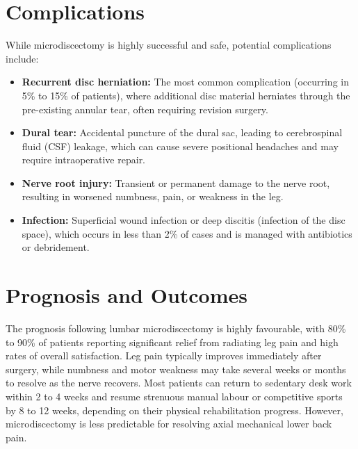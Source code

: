 \section*{Complications}
While microdiscectomy is highly successful and safe, potential complications include:
\begin{itemize}
    \item \textbf{Recurrent disc herniation:} The most common complication (occurring in 5\% to 15\% of patients), where additional disc material herniates through the pre-existing annular tear, often requiring revision surgery.
    \item \textbf{Dural tear:} Accidental puncture of the dural sac, leading to cerebrospinal fluid (CSF) leakage, which can cause severe positional headaches and may require intraoperative repair.
    \item \textbf{Nerve root injury:} Transient or permanent damage to the nerve root, resulting in worsened numbness, pain, or weakness in the leg.
    \item \textbf{Infection:} Superficial wound infection or deep discitis (infection of the disc space), which occurs in less than 2\% of cases and is managed with antibiotics or debridement.
\end{itemize}

\section*{Prognosis and Outcomes}
The prognosis following lumbar microdiscectomy is highly favourable, with 80\% to 90\% of patients reporting significant relief from radiating leg pain and high rates of overall satisfaction. Leg pain typically improves immediately after surgery, while numbness and motor weakness may take several weeks or months to resolve as the nerve recovers. Most patients can return to sedentary desk work within 2 to 4 weeks and resume strenuous manual labour or competitive sports by 8 to 12 weeks, depending on their physical rehabilitation progress. However, microdiscectomy is less predictable for resolving axial mechanical lower back pain.

